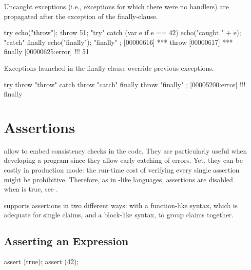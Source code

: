 Uncaught exceptions (i.e., exceptions for which there were no handlers) are
propagated after the exception of the finally-clause.

\begin{urbiscript}
try                      { echo("throw"); throw 51; "try" }
catch (var e if e == 42) { echo("caught " + e);     "catch" }
finally                  { echo("finally");         "finally" };
[00000616] *** throw
[00000617] *** finally
[00000625:error] !!! 51
\end{urbiscript}

Exceptions launched in the finally-clause override previous exceptions.

\begin{urbiscript}
try     { throw "throw" }
catch   { throw "catch" }
finally { throw "finally" };
[00005200:error] !!! finally
\end{urbiscript}



\section{Assertions}
\label{sec:lang:assert}


 allow to embed consistency checks in the code.
They are particularly useful when developing a program since they allow
early catching of errors.  Yet, they can be costly in production mode: the
run-time cost of verifying every single assertion might be prohibitive.
Therefore, as in \langC-like languages, assertions are disabled when
 is true, see .

\us supports assertions in two different ways: with a function-like
syntax, which is adequate for single claims, and a block-like syntax,
to group claims together.

\subsection{Asserting an Expression}

\begin{urbiscript}
assert (true);
assert (42);
\end{urbiscript}

